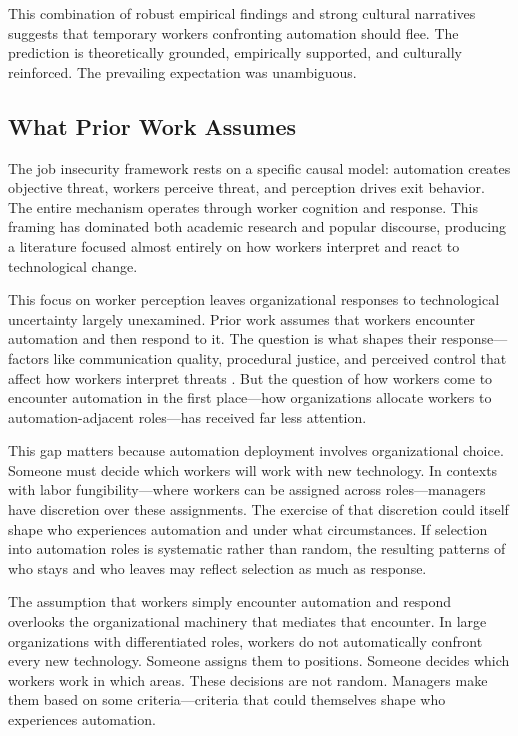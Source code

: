 \documentclass[12pt]{article}
\begin{document}
This combination of robust empirical findings and strong cultural narratives suggests that temporary workers confronting automation should flee. The prediction is theoretically grounded, empirically supported, and culturally reinforced. The prevailing expectation was unambiguous.

\subsection{What Prior Work Assumes}

The job insecurity framework rests on a specific causal model: automation creates objective threat, workers perceive threat, and perception drives exit behavior. The entire mechanism operates through worker cognition and response. This framing has dominated both academic research and popular discourse, producing a literature focused almost entirely on how workers interpret and react to technological change.

This focus on worker perception leaves organizational responses to technological uncertainty largely unexamined. Prior work assumes that workers encounter automation and then respond to it. The question is what shapes their response---factors like communication quality, procedural justice, and perceived control that affect how workers interpret threats \citep{brockner1994interactive, ashford1989content}. But the question of how workers come to encounter automation in the first place---how organizations allocate workers to automation-adjacent roles---has received far less attention.

This gap matters because automation deployment involves organizational choice. Someone must decide which workers will work with new technology. In contexts with labor fungibility---where workers can be assigned across roles---managers have discretion over these assignments. The exercise of that discretion could itself shape who experiences automation and under what circumstances. If selection into automation roles is systematic rather than random, the resulting patterns of who stays and who leaves may reflect selection as much as response.

The assumption that workers simply encounter automation and respond overlooks the organizational machinery that mediates that encounter. In large organizations with differentiated roles, workers do not automatically confront every new technology. Someone assigns them to positions. Someone decides which workers work in which areas. These decisions are not random. Managers make them based on some criteria---criteria that could themselves shape who experiences automation.
\end{document}
